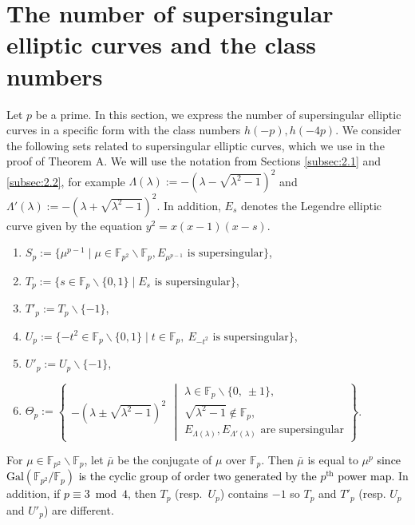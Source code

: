 \documentclass[10pt,a4paper]{amsart}
\theoremstyle{plain}
\newcommand{\lm}{\lambda}
\newcommand{\Lm}{\Lambda}
\newcommand{\fp}{\mathbb{F}_p}
\newcommand{\fpp}{\mathbb{F}_{p^2}}
\begin{document}
\section{The number of supersingular elliptic curves and the class numbers}\label{sec:ssing_and_classnum}
Let $p$ be a prime. In this section, we express the number of supersingular elliptic curves in a specific form with the class numbers $h(-p),h(-4p)$.
We consider the following sets related to supersingular elliptic curves, which we use in the proof of Theorem A.
We \textcolor{black}{will} use the notation \textcolor{black}{from} Sections \ref{subsec:2.1} and \ref{subsec:2.2}, for example $\Lm(\lm):=-(\lm - \sqrt{{\lm}^2-1})^2$ and ${\Lm}'(\lm):= -(\lm + \sqrt{{\lm}^2-1})^2$. In addition, $E_s$ denotes the Legendre elliptic curve given by the equation $y^2=x(x-1)(x-s)$.
\begin{enumerate}
      \item[]$S_p:=\{ {\mu}^{p-1} \mid \mu \in \fpp \smallsetminus \fp , E_{{\mu}^{p-1}} \text{ is supersingular} \}$,
    \item [] $T_p:=\{ s \in \fp\smallsetminus\{0,1 \} \mid E_s\text{ is supersingular} \}$,
    \item[] $T'_p:=T_p\smallsetminus\{-1\}$,
    \item[] $U_p:=\{-t^2 \in \fp\smallsetminus\{0,1 \} \mid t\in \fp,\ E_{-t^2} \text{ is supersingular} \}$,
    \item[] $U'_p:=U_p\smallsetminus\{-1\}$,
 \item[] ${\Theta}_p:=\left\{
 \begin{array}{cc}
       -(\lm \pm \sqrt{{\lm}^2-1})^2 
 \end{array}
\middle|  
 \begin{array}{ccc}
       \lm \in \fp \smallsetminus\{0,\ \pm1\},\\ \sqrt{{\lm}^2-1} \notin \fp ,\\
      E_{\Lm(\lm)},E_{{\Lm}'(\lm)}\text{ are supersingular}
 \end{array}
\right\}$.
\end{enumerate}
For $\mu \in \fpp \smallsetminus \fp$, let $\overline{\mu}$ be the conjugate of $\mu$ over $\fp$. Then $\overline{\mu}$ is equal to ${\mu}^p$ \textcolor{black}{since $\text{Gal}(\fpp/\fp)$ is the cyclic group of order two generated by the $p^{\text{th}}$ power map.} In addition, if \textcolor{black}{$p \equiv 3\bmod 4$}, then $T_p$ (resp.\ $U_p$) contains $-1$ so $T_p$ and $T'_p$ (resp. $U_p$ and $U'_p$) are different. 
\end{document}
